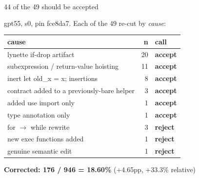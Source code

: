 \documentclass[aspectratio=169,10pt]{beamer}
\newcommand{\code}[1]{{\ttfamily #1}}
\newcommand{\good}[1]{{\color{lgGreen}#1}}
\newcommand{\bad}[1]{{\color{lgRed}#1}}
\begin{document}
\begin{frame}{44 of the 49 should be accepted}

{\scriptsize gpt55, s0, pin \code{fce8da7}. Each of the 49 re-cut by \emph{cause}:}

\vspace{4pt}
\begin{center}
{\scriptsize
\begin{tabular}{lrl}
\toprule
\textbf{cause} & \textbf{n} & \textbf{call} \\
\midrule
lynette if-drop artifact                         & 20 & \good{\textbf{accept}} \\
subexpression / return-value hoisting            & 11 & \good{\textbf{accept}} \\
inert \code{let old\_x = x;} insertions          & 8  & \good{\textbf{accept}} \\
contract added to a previously-bare helper       & 3  & \good{\textbf{accept}} \\
added \code{use} import only                     & 1  & \good{\textbf{accept}} \\
type annotation only                             & 1  & \good{\textbf{accept}} \\
\code{for} $\to$ \code{while} rewrite            & 3  & \bad{\textbf{reject}} \\
new exec functions added                         & 1  & \bad{\textbf{reject}} \\
genuine semantic edit                            & 1  & \bad{\textbf{reject}} \\
\bottomrule
\end{tabular}
}
\end{center}

\vspace{8pt}
\begin{center}
{\large\bad{\textbf{Corrected: 176 / 946 = 18.60\%} \normalsize(+4.65pp, +33.3\% relative)}}
\end{center}

\end{frame}
\end{document}
